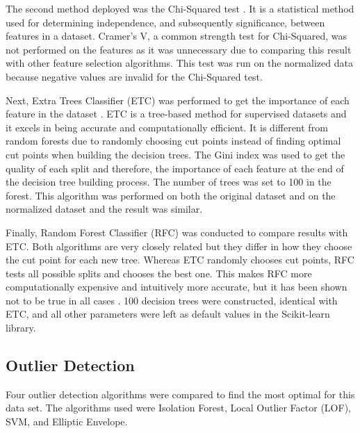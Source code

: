 \documentclass[letterpaper, 12 pt, conference]{ieeeconf}  %
\begin{document}
The second method deployed was the Chi-Squared test \cite{McHugh}. It is a statistical method used for determining independence, and subsequently significance, between features in a dataset. Cramer’s V, a common strength test for Chi-Squared, was not performed on the features as it was unnecessary due to comparing this result with other feature selection algorithms. This test was run on the normalized data because negative values are invalid for the Chi-Squared test.
        
Next, Extra Trees Classifier (ETC) was performed to get the importance of each feature in the dataset \cite{Geurts}. ETC is a tree-based method for supervised datasets and it excels in being accurate and computationally efficient. It is different from random forests due to randomly choosing cut points instead of finding optimal cut points when building the decision trees. The Gini index was used to get the quality of each split and therefore, the importance of each feature at the end of the decision tree building process. The number of trees was set to 100 in the forest. This algorithm was performed on both the original dataset and on the normalized dataset and the result was similar.
        
Finally, Random Forest Classifier (RFC) was conducted to compare results with ETC. Both algorithms are very closely related but they differ in how they choose the cut point for each new tree. Whereas ETC randomly chooses cut points, RFC tests all possible splits and chooses the best one. This makes RFC more computationally expensive and intuitively more accurate, but it has been shown not to be true in all cases \cite{Geurts}. 100 decision trees were constructed, identical with ETC, and all other parameters were left as default values in the Scikit-learn library.

\subsection{Outlier Detection}

Four outlier detection algorithms were compared to find the most optimal for this data set. The algorithms used were Isolation Forest, Local Outlier Factor (LOF), SVM, and Elliptic Envelope.
        
\end{document}
